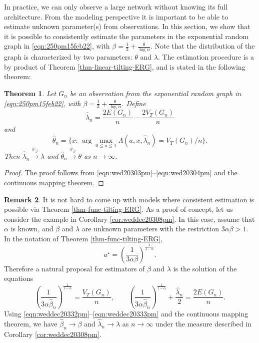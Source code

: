 \documentclass[bj,authoryear,noshowframe]{imsart}
\numberwithin{equation}{section}
\theoremstyle{plain}
\newtheorem{thm}{Theorem}[section]
\theoremstyle{definition}
\newtheorem{rmk}[thm]{Remark}
\newcommand{\sss}{\scriptscriptstyle}
\newcommand {\convpbeta}{\stackrel{\sss {\mathbb P}_{\beta}}{\longrightarrow}}
\begin{document}
In practice, we can only observe a large network without knowing its full architecture. From the modeling perspective it is important to be able to estimate unknown parameter(s) from observations. In this section, we show that it is possible to consistently estimate the parameters in the exponential random graph in \eqref{eqn:250pm15feb22}, with $\beta=\tfrac13+\frac{\theta}{\log n}$. Note that the distribution of the graph is characterized by two parameters: $\theta$ and $\lambda$. The estimation procedure is a by product of Theorem \ref{thm-linear-tilting-ERG}, and is stated in the following theorem:

\begin{thm}
Let $G_n$ be an observation from the exponential random graph in \eqref{eqn:250pm15feb22}, with $\beta=\tfrac13+\frac{\theta}{\log n}$. Define 
$$
\hat{\lambda}_n = \frac{2E(G_n)}{n} -\frac{2V_T(G_n)}{n}
$$ 
and 
$$
\hat{\theta}_n = \{x\colon\, \arg\max_{0\leq a\leq 1}\Lambda(a,x,\hat{\lambda}_n)= V_T(G_n)/n\}.
$$
Then $\hat{\lambda}_n \convpbeta \lambda$ and $\hat{\theta}_n \convpbeta \theta$ as $n \to \infty$.
\end{thm}

\begin{proof}
The proof follows from \eqref{eqn:wed20303pm}--\eqref{eqn:wed20304pm} and the continuous mapping theorem.
\end{proof}

\begin{rmk}
{\rm It is not hard to come up with models where consistent estimation is possible via Theorem \ref{thm-func-tilting-ERG}. As a proof of concept, let us consider the example in Corollary \ref{cor:weddec20308pm}. In this case, assume that $\alpha$ is known, and $\beta$ and $\lambda$ are unknown parameters with the restriction $3\alpha\beta >1$. In the notation of Theorem \ref{thm-func-tilting-ERG}, 
$$
a^\star = \left(\frac{1}{3\alpha \beta}\right)^{\tfrac{1}{1-\alpha}}.
$$ 
Therefore a natural proposal for estimators of $\beta$ and $\lambda$ is the solution of the equations
\begin{equation}
\left(\frac{1}{3\alpha \hat{\beta}_n}\right)^{\tfrac{1}{1-\alpha}} = \frac{V_T(G_n)}{n}, \qquad
\left(\frac{1}{3\alpha \hat{\beta}_n}\right)^{\tfrac{1}{1-\alpha}} + \frac{\hat{\lambda}_n}{2} =\frac{2E(G_n)}{n}.
\end{equation}
Using \eqref{eqn:weddec20332pm}--\eqref{eqn:weddec20333pm} and the continuous mapping theorem, we have $\hat{\beta}_n \to \beta$ and $\hat{\lambda}_n \to \lambda$ as $n\to \infty$ under the measure described in Corollary \ref{cor:weddec20308pm}.}
\end{rmk}
\end{document}
